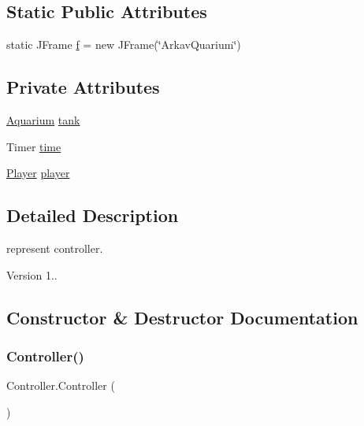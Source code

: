 \subsection*{Static Public Attributes}
\begin{DoxyCompactItemize}
\item 
static J\+Frame \mbox{\hyperlink{class_controller_a77eb7e2f012edbfa7296d765c3f11b52}{f}} = new J\+Frame(\char`\"{}Arkav\+Quarium\char`\"{})
\end{DoxyCompactItemize}
\subsection*{Private Attributes}
\begin{DoxyCompactItemize}
\item 
\mbox{\hyperlink{class_aquarium}{Aquarium}} \mbox{\hyperlink{class_controller_ad36875a9a542b89d92583d79567db811}{tank}}
\item 
Timer \mbox{\hyperlink{class_controller_a2f43fd03a6aee6119a7d2d090555194b}{time}}
\item 
\mbox{\hyperlink{class_player}{Player}} \mbox{\hyperlink{class_controller_a906f3cb8bda1e63ea53825652e155aaf}{player}}
\end{DoxyCompactItemize}


\subsection{Detailed Description}
represent controller. \begin{DoxyVersion}{Version}
1.. 
\end{DoxyVersion}


\subsection{Constructor \& Destructor Documentation}
\mbox{\label{class_controller_a01483f901cb33bf522ceab23a32e56f2}} 
\subsubsection{\texorpdfstring{Controller()}{Controller()}}
{\footnotesize\ttfamily Controller.\+Controller (\begin{DoxyParamCaption}{ }\end{DoxyParamCaption})\hspace{0.3cm}{\ttfamily [inline]}}

